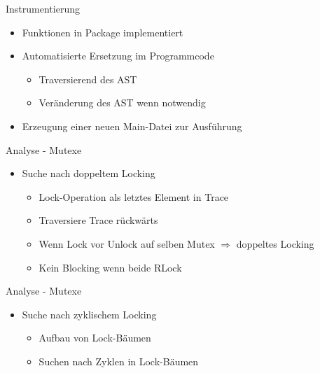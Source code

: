 \documentclass[aspectratio=169]{beamer}  %
\begin{document}
%   

%   

\begin{frame}{Instrumentierung}
  \begin{itemize}
    \item Funktionen in Package implementiert
    \item Automatisierte Ersetzung im Programmcode
    \begin{itemize}
      \item Traversierend des AST
      \item Veränderung des AST wenn notwendig
    \end{itemize}
    \item Erzeugung einer neuen Main-Datei zur Ausführung
  \end{itemize}
\end{frame}




\begin{frame}{Analyse - Mutexe}
  \begin{itemize}
    \item Suche nach doppeltem Locking
    \begin{itemize}
      \item Lock-Operation als letztes Element in Trace
      \item Traversiere Trace rückwärts
      \item Wenn Lock vor Unlock auf selben Mutex $\Rightarrow$ doppeltes Locking
      \item Kein Blocking wenn beide RLock
    \end{itemize}
  \end{itemize}
\end{frame}

\begin{frame}{Analyse - Mutexe}
  \begin{itemize}
    \item Suche nach zyklischem Locking
    \begin{itemize}
      \item Aufbau von Lock-Bäumen
      \item Suchen nach Zyklen in Lock-Bäumen
    \end{itemize}
  \end{itemize}
\end{frame}
\end{document}

